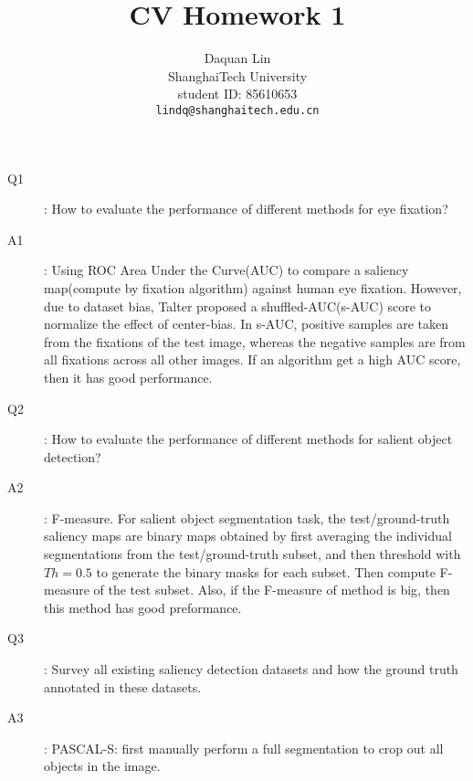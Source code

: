 \documentclass[10pt,letterpaper]{article}
\begin{document}
\title{CV Homework 1}

\author{Daquan Lin\\
ShanghaiTech University\\
student ID: 85610653\\
{\tt\small lindq@shanghaitech.edu.cn}
}

\maketitle


\begin{description}
\item[Q1]: How to evaluate the perf{}ormance of different methods for eye fixation?
\item[A1]: Using ROC Area Under the Curve(AUC)\cite{davis2006relationship} to compare a saliency map(compute by fixation algorithm) against human eye fixation. However, due to dataset bias\cite{li2014secrets}, Talter proposed a shuffled-AUC(s-AUC) score\cite{tatler2005visual} to normalize the effect of center-bias. In s-AUC, positive samples are taken from the fixations of the test image, whereas the negative samples are from all fixations across all other images. If an algorithm get a high AUC score, then it has good performance.\\
\item[Q2]: How to evaluate the performance of different methods for salient object detection?
\item[A2]: F-measure\cite{powers2011evaluation}. For salient object segmentation task, the test/ground-truth saliency maps are binary maps obtained by first averaging the individual segmentations from the test/ground-truth subset, and then threshold with $Th=0.5$ to generate the binary masks for each subset. Then compute F-measure of the test subset\cite{li2014secrets}. Also, if the F-measure of method is big, then this method has good preformance.\\
\item[Q3]: Survey all existing saliency detection datasets and how the ground truth annotated in these datasets.
\item[A3]: PASCAL-S\cite{li2014secrets}: first manually perform a full segmentation to crop out all objects in the image. 

\end{description}
\end{document}
